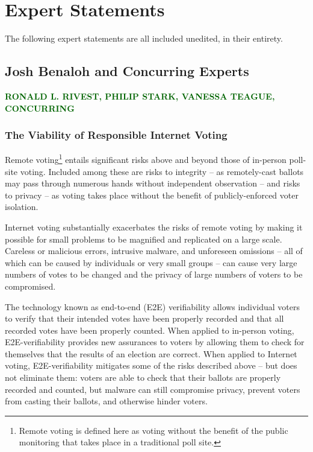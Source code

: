 \ifstatementsonly
\renewcommand{\thesection}{\arabic{section}}
\else
\chapter{Expert Statements}
\label{appendix:expert_statements}

The following expert statements are all included unedited, in their
entirety.
\fi

\section{Josh Benaloh and Concurring Experts}

{\Large\sffamily\bfseries\textcolor{DarkGreen}{\MakeUppercase{Ronald
      L. Rivest, Philip Stark, Vanessa Teague, Concurring}}}

\subsection*{The Viability of Responsible Internet Voting}

Remote voting\footnote{Remote voting is defined here as voting without
  the benefit of the public monitoring that takes place in a
  traditional poll site.}  entails significant risks above and beyond
those of in-person poll-site voting.  Included among these are risks
to integrity – as remotely-cast ballots may pass through numerous
hands without independent observation – and risks to privacy – as
voting takes place without the benefit of publicly-enforced voter
isolation.

Internet voting substantially exacerbates the risks of remote voting
by making it possible for small problems to be magnified and
replicated on a large scale.  Careless or malicious errors, intrusive
malware, and unforeseen omissions – all of which can be caused by
individuals or very small groups – can cause very large numbers of
votes to be changed and the privacy of large numbers of voters to be
compromised.

The technology known as end-to-end (E2E) verifiability allows
individual voters to verify that their intended votes have been
properly recorded and that all recorded votes have been properly
counted.  When applied to in-person voting, E2E-verifiability provides
new assurances to voters by allowing them to check for themselves that
the results of an election are correct.  When applied to Internet
voting, E2E-verifiability mitigates some of the risks described above
– but does not eliminate them:  voters are able to check that their
ballots are properly recorded and counted, but malware can still
compromise privacy, prevent voters from casting their ballots, and
otherwise hinder voters.

